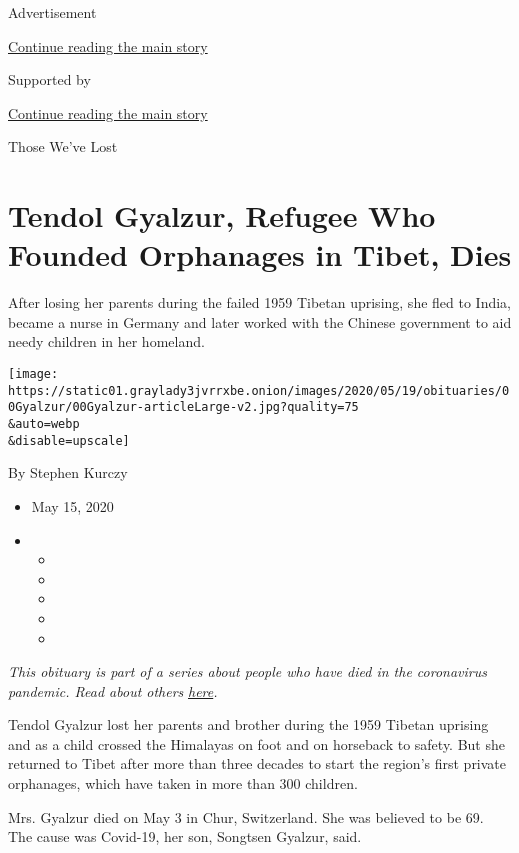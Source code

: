 Advertisement

\protect\hyperlink{after-top}{Continue reading the main story}

Supported by

\protect\hyperlink{after-sponsor}{Continue reading the main story}

Those We've Lost

\hypertarget{tendol-gyalzur-refugee-who-founded-orphanages-in-tibet-dies}{%
\section{Tendol Gyalzur, Refugee Who Founded Orphanages in Tibet,
Dies}\label{tendol-gyalzur-refugee-who-founded-orphanages-in-tibet-dies}}

After losing her parents during the failed 1959 Tibetan uprising, she
fled to India, became a nurse in Germany and later worked with the
Chinese government to aid needy children in her homeland.

\texttt{[image: https://static01.graylady3jvrrxbe.onion/images/2020/05/19/obituaries/00Gyalzur/00Gyalzur-articleLarge-v2.jpg?quality=75\\\&auto=webp\\\&disable=upscale]}

By Stephen Kurczy

\begin{itemize}
\item
  May 15, 2020
\item
  \begin{itemize}
  \item
  \item
  \item
  \item
  \item
  \end{itemize}
\end{itemize}

\emph{This obituary is part of a series about people who have died in
the coronavirus pandemic. Read about others}
\href{https://www.nytimes3xbfgragh.onion/series/people-who-have-died-of-the-coronavirus}{\emph{here}}\emph{.}

Tendol Gyalzur lost her parents and brother during the 1959 Tibetan
uprising and as a child crossed the Himalayas on foot and on horseback
to safety. But she returned to Tibet after more than three decades to
start the region's first private orphanages, which have taken in more
than 300 children.

Mrs. Gyalzur died on May 3 in Chur, Switzerland. She was believed to be
69. The cause was Covid-19, her son, Songtsen Gyalzur, said.

